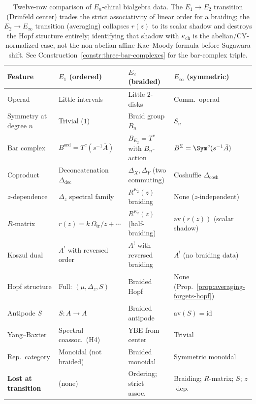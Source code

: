 \begin{remark}
\begin{table}[ht]
\centering
\small
\renewcommand{\arraystretch}{1.25}
\begin{tabular}{@{}l@{\;\;}l@{\;\;}l@{\;\;}l@{}}
\toprule
\textbf{Feature} & \textbf{$E_1$ (ordered)} & \textbf{$E_2$ (braided)} & \textbf{$E_\infty$ (symmetric)} \\
\midrule
Operad & Little intervals & Little $2$-disks & Comm.\ operad \\
Symmetry at degree $n$ & Trivial ($1$) & Braid group $B_n$ & $S_n$ \\
Bar complex & $B^{\mathrm{ord}} = T^c(s^{-1}\bar A)$ & $B_{E_2} = T^c$ with $B_n$-action & $B^{\Sigma} = \Sym^c(s^{-1}\bar A)$ \\
Coproduct & Deconcatenation $\Delta_{\mathrm{dec}}$ & $\Delta_X, \Delta_Y$ (two commuting) & Coshuffle $\Delta_{\mathrm{cosh}}$ \\
$z$-dependence & $\Delta_z$ spectral family & $R^{E_2}(z)$ braiding & None ($z$-independent) \\
$R$-matrix & $r(z) = k\,\Omega_{\mathrm{tr}}/z + \cdots$ & $R^{E_2}(z)$ (half-braiding) & $\mathrm{av}(r(z))$ (scalar shadow) \\
Koszul dual & $A^!$ with reversed order & $A^!$ with reversed braiding & $A^!$ (no braiding data) \\
Hopf structure & Full: $(\mu, \Delta_z, S)$ & Braided Hopf & None (Prop.~\ref{prop:averaging-forgets-hopf}) \\
Antipode $S$ & $S \colon A \to A$ & Braided antipode & $\mathrm{av}(S) = \mathrm{id}$ \\
Yang--Baxter & Spectral coassoc.\ (H4) & YBE from center & Trivial \\
Rep.\ category & Monoidal (not braided) & Braided monoidal & Symmetric monoidal \\
\midrule
\textbf{Lost at transition} & (none) & Ordering; strict assoc.\ & Braiding; $R$-matrix; $S$; $z$-dep. \\
\bottomrule
\end{tabular}
\caption{Twelve-row comparison of $E_n$-chiral bialgebra data.
The $E_1 \to E_2$ transition (Drinfeld center) trades the strict
associativity of linear order for a braiding; the $E_2 \to E_\infty$
transition (averaging) collapses $r(z)$ to its scalar shadow
and destroys the Hopf structure entirely; identifying that shadow with
$\kappa_{\mathrm{ch}}$ is the abelian/CY-normalized case, not the
non-abelian affine Kac--Moody formula before Sugawara shift.
See Construction~\ref{constr:three-bar-complexes} for the
bar-complex triple.}
\label{tab:en-chiral-comparison}
\end{table}


\end{remark}
